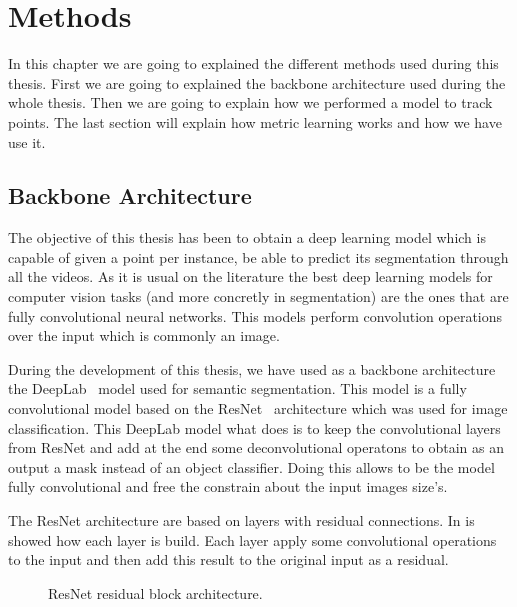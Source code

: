 
\chapter{Methods}
\label{cha:methods}

In this chapter we are going to explained the different methods used during this thesis.
First we are going to explained the backbone architecture used during the whole thesis.
Then we are going to explain how we performed a model to track points.
The last section will explain how metric learning works and how we have use it.

\section{Backbone Architecture}
\label{sec:methods_backbone_architecture}

The objective of this thesis has been to obtain a deep learning model which is capable of given a point per instance, be able to predict its segmentation through all the videos.
As it is usual on the literature the best deep learning models for computer vision tasks (and more concretly in segmentation) are the ones that are fully convolutional neural networks.
This models perform convolution operations over the input which is commonly an image.

During the development of this thesis, we have used as a backbone architecture the DeepLab~\cite{chen2018deeplab} model used for semantic segmentation.
This model is a fully convolutional model based on the ResNet~\cite{he2016deep} architecture which was used for image classification.
This DeepLab model what does is to keep the convolutional layers from ResNet and add at the end some deconvolutional operatons to obtain as an output a mask instead of an object classifier.
Doing this allows to be the model fully convolutional and free the constrain about the input images size's.

The ResNet architecture are based on layers with residual connections. In  is showed how each layer is build.
Each layer apply some convolutional operations to the input and then add this result to the original input as a residual.

\begin{figure}[h]
  \centering
  \caption{ResNet residual block architecture. }
  \label{fig:resnet_block}
\end{figure}

